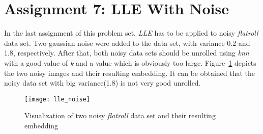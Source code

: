 
\section{Assignment 7: LLE With Noise}
\label{assignment7}

In the last assignment of this problem set, \textit{LLE} has to be applied to noisy \textit{flatroll} data set. Two gaussian noise were added to the data set, with variance 0.2 and 1.8, respectively. After that, both noisy data sets should be unrolled using \textit{knn} with a good value of \textit{k} and a value which is obviously too large. Figure~\ref{fig:llenoisy} depicts the two noisy images and their resulting embedding. It can be obtained that the noisy data set with big variance(1.8) is not very good unrolled.

\begin{figure}[h!]
	\centering
	\texttt{[image: lle\_noise]}
	\caption{Visualization of two noisy \textit{flatroll} data set and their resulting embedding}
	\label{fig:llenoisy}
\end{figure}

